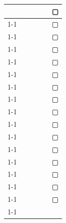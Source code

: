 \documentclass[paper=a4, fontsize=10bp]{jlreq}
\begin{document}
\begin{table}[H]
\begin{minipage}[h]{0.4\linewidth}
\begin{tabular}{cccccc}
            \multicolumn{1}{|c|}{} & & \multicolumn{1}{|c|}{} & & \multicolumn{1}{|c|}{} & ▢  \\ \cline{1-1} \cline{3-3} \cline{5-5}
            \multicolumn{1}{|c|}{} & & \multicolumn{1}{|c|}{} & & \multicolumn{1}{|c|}{} & ▢  \\ \cline{1-1} \cline{3-3} \cline{5-5}
            \multicolumn{1}{|c|}{} & & \multicolumn{1}{|c|}{} & & \multicolumn{1}{|c|}{} & ▢  \\ \cline{1-1} \cline{3-3} \cline{5-5}
            \multicolumn{1}{|c|}{} & & \multicolumn{1}{|c|}{} & & \multicolumn{1}{|c|}{} & ▢  \\ \cline{1-1} \cline{3-3} \cline{5-5}
            \multicolumn{1}{|c|}{} & & \multicolumn{1}{|c|}{} & & \multicolumn{1}{|c|}{} & ▢  \\ \cline{1-1} \cline{3-3} \cline{5-5}
            \multicolumn{1}{|c|}{} & & \multicolumn{1}{|c|}{} & & \multicolumn{1}{|c|}{} & ▢  \\ \cline{1-1} \cline{3-3} \cline{5-5}
            \multicolumn{1}{|c|}{} & & \multicolumn{1}{|c|}{} & & \multicolumn{1}{|c|}{} & ▢  \\ \cline{1-1} \cline{3-3} \cline{5-5}
            \multicolumn{1}{|c|}{} & & \multicolumn{1}{|c|}{} & & \multicolumn{1}{|c|}{} & ▢  \\ \cline{1-1} \cline{3-3} \cline{5-5}
            \multicolumn{1}{|c|}{} & & \multicolumn{1}{|c|}{} & & \multicolumn{1}{|c|}{} & ▢  \\ \cline{1-1} \cline{3-3} \cline{5-5}
            \multicolumn{1}{|c|}{} & & \multicolumn{1}{|c|}{} & & \multicolumn{1}{|c|}{} & ▢  \\ \cline{1-1} \cline{3-3} \cline{5-5}
            \multicolumn{1}{|c|}{} & & \multicolumn{1}{|c|}{} & & \multicolumn{1}{|c|}{} & ▢  \\ \cline{1-1} \cline{3-3} \cline{5-5}
            \multicolumn{1}{|c|}{} & & \multicolumn{1}{|c|}{} & & \multicolumn{1}{|c|}{} & ▢  \\ \cline{1-1} \cline{3-3} \cline{5-5}
            \multicolumn{1}{|c|}{} & & \multicolumn{1}{|c|}{} & & \multicolumn{1}{|c|}{} & ▢  \\ \cline{1-1} \cline{3-3} \cline{5-5}
            \multicolumn{1}{|c|}{} & & \multicolumn{1}{|c|}{} & & \multicolumn{1}{|c|}{} & ▢  \\ \cline{1-1} \cline{3-3} \cline{5-5}
            \multicolumn{1}{|c|}{} & & \multicolumn{1}{|c|}{} & & \multicolumn{1}{|c|}{} & ▢  \\ \cline{1-1} \cline{3-3} \cline{5-5}
            \multicolumn{1}{|c|}{} & & \multicolumn{1}{|c|}{} & & \multicolumn{1}{|c|}{} & ▢  \\ \cline{1-1} \cline{3-3} \cline{5-5}

\end{tabular}
\end{minipage}
\end{table}
\end{document}
